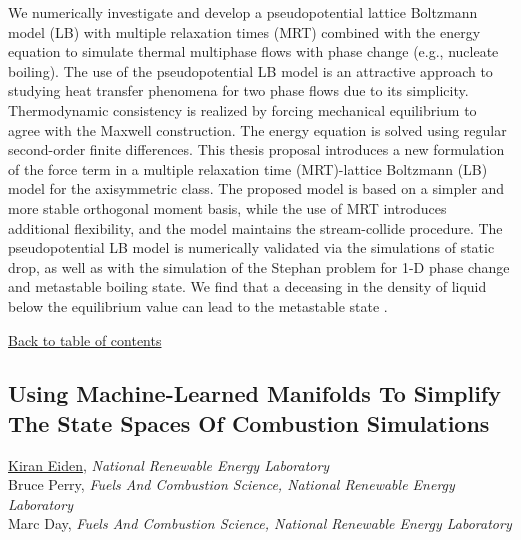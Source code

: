 \noindent We numerically investigate and develop a pseudopotential lattice Boltzmann model (LB) with multiple relaxation times (MRT) combined with the energy equation to simulate thermal multiphase flows with phase change (e.g., nucleate boiling). The use of the pseudopotential LB model is an attractive approach to studying heat transfer phenomena for two phase flows due to its simplicity. Thermodynamic consistency is realized by forcing mechanical equilibrium to agree with the Maxwell construction. The energy equation is solved using regular second-order finite differences. This thesis proposal introduces a new formulation of the force term in a multiple relaxation time (MRT)-lattice Boltzmann (LB) model for the axisymmetric class. The proposed model is based on a simpler and more stable orthogonal moment basis, while the use of MRT introduces additional flexibility, and the model maintains the stream-collide procedure. The pseudopotential LB model is numerically validated via the simulations of static drop, as well as with the simulation of the Stephan problem for 1-D phase change and metastable boiling state. We find that a deceasing in the density of liquid below the equilibrium value can lead to the metastable state . \\ 
\begin{flushright}\vspace{-0.2 in}\hyperlink{toc}{Back to table of contents}\end{flushright}\vspace{-0.2 in}
\hypertarget{KiranEiden}{\subsection*{\color{CUGOLD} Using Machine-Learned Manifolds To Simplify The State Spaces Of Combustion Simulations}} \vsp 
\underline{Kiran Eiden}, \textit{National Renewable Energy Laboratory}\\ 
{Bruce Perry}, \textit{Fuels And Combustion Science, National Renewable Energy Laboratory}\\ 
{Marc Day}, \textit{Fuels And Combustion Science, National Renewable Energy Laboratory}\\ 
\vspace{-0.1 in} \\ 
